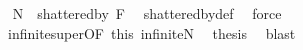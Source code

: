 \begin{isabellebody}
\ \isamarkupfalse%
\ {\isachardoublequoteopen}{\isacharquery}{\kern0pt}N\ {\isasymsubseteq}\ shattered{\isacharunderscore}{\kern0pt}by\ {\isacharquery}{\kern0pt}F{\isachardoublequoteclose}\ \isamarkupfalse%
\ shattered{\isacharunderscore}{\kern0pt}by{\isacharunderscore}{\kern0pt}def\ \isamarkupfalse%
\ force\isanewline
\ \ \isamarkupfalse%
\ {}\ infinite{\isacharunderscore}{\kern0pt}super{\isacharbrackleft}{\kern0pt}OF\ this\ infinite{\isacharunderscore}{\kern0pt}N{\isacharbrackright}{\kern0pt}\ \isamarkupfalse%
\ {\isacharquery}{\kern0pt}thesis\ \isamarkupfalse%
\ blast\isanewline
{}\isamarkupfalse%
%
\endisatagproof
{\isafoldproof}%
%
\isadelimproof
\isanewline
%
\endisadelimproof
%
\isadelimtheory
\isanewline
%
\endisadelimtheory
%
\isatagtheory
{}\isamarkupfalse%
%
\endisatagtheory
{\isafoldtheory}%
%
\isadelimtheory
%
\endisadelimtheory
%
\end{isabellebody}%
\endinput
